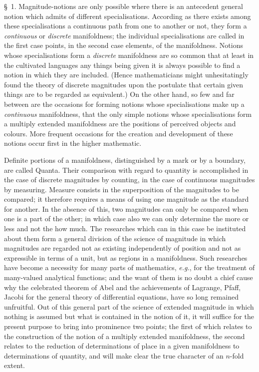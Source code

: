 \documentclass[a4paper,12pt]{article}
\begin{document}
\bigbreak

\S~1.
Magnitude-notions are only possible where there is an antecedent
general notion which admits of different specialisations.
According as there exists among these specialisations a continuous
path from one to another or not, they form a \emph{continuous} or
\emph{discrete} manifoldness; the individual specialisations are
called in the first case points, in the second case elements, of
the manifoldness.  Notions whose specialisations form a
\emph{discrete} manifoldness are so common that at least in the
cultivated languages any things being given it is always possible
to find a notion in which they are included.  (Hence
mathematicians might unhesitatingly found the theory of discrete
magnitudes upon the postulate that certain given things are to
be regarded as equivalent.)  On the other hand, so few and far
between are the occasions for forming notions whose
specialisations make up a \emph{continuous} manifoldness, that
the only simple notions whose specialisations form a multiply
extended manifoldness are the positions of perceived objects and
colours.  More frequent occasions for the creation and
development of these notions occur first in the higher
mathematic.

Definite portions of a manifoldness, distinguished by a mark or
by a boundary, are called Quanta.  Their comparison with regard
to quantity is accomplished in the case of discrete magnitudes by
counting, in the case of continuous magnitudes by measuring.
Measure consists in the superposition of the magnitudes to be
compared; it therefore requires a means of using one magnitude as
the standard for another.  In the absence of this, two magnitudes
can only be compared when one is a part of the other; in which
case also we can only determine the more or less and not the how
much.  The researches which can in this case be instituted about
them form a general division of the science of magnitude in which
magnitudes are regarded not as existing independently of position
and not as expressible in terms of a unit, but as regions in a
manifoldness.  Such researches have become a necessity for many
parts of mathematics, \emph{e.g.}, for the treatment of many-valued
analytical functions; and the want of them is no doubt a chief
cause why the celebrated theorem of Abel and the achievements of
Lagrange, Pfaff, Jacobi for the general theory of differential
equations, have so long remained unfruitful.  Out of this general
part of the science of extended magnitude in which nothing is
assumed but what is contained in the notion of it, it will
suffice for the present purpose to bring into prominence two
points; the first of which relates to the construction of the
notion of a multiply extended manifoldness, the second relates to
the reduction of determinations of place in a given manifoldness
to determinations of quantity, and will make clear the true
character of an $n$-fold extent.
\end{document}
